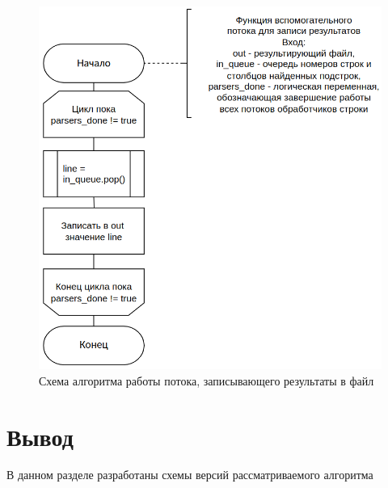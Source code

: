 \begin{figure}[h]
	\centering
	\includegraphics[height=0.6\textheight]{img/thread_writer.png}
	\caption{Схема алгоритма работы потока, записывающего результаты в файл}
	\label{fig:writer}
\end{figure}

\section*{Вывод}

В данном разделе разработаны схемы версий рассматриваемого алгоритма
